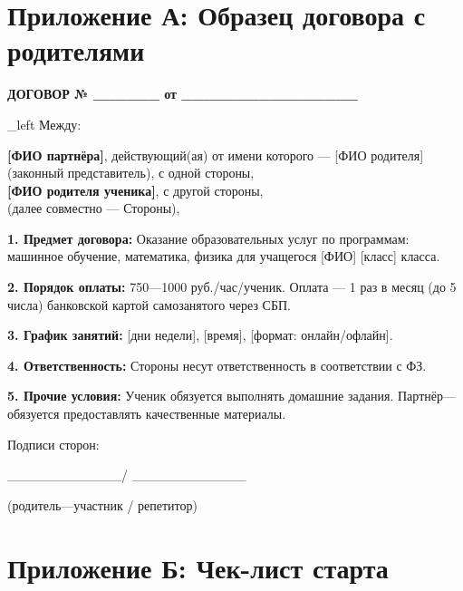 \documentclass[12pt,a4paper]{article}
\begin{document}

\newpage
\section*{Приложение А: Образец договора с родителями}

\textbf{ДОГОВОР № \_\_\_\_\_\_ от \_\_\_\_\_\_\_\_\_\_\_\_\_\_\_\_}

{\ragged_left Между: \par}
{\raggedright
\textbf{[ФИО партнёра]}, действующий(ая) от имени которого --- [ФИО родителя] (законный представитель), с одной стороны, \\
\textbf{[ФИО родителя ученика]}, с другой стороны, \\
(далее совместно --- Стороны), \\
}

\textbf{1. Предмет договора:} Оказание образовательных услуг по программам: машинное обучение, математика, физика для учащегося [ФИО] [класс] класса.

\textbf{2. Порядок оплаты:} 750---1000 руб./час/ученик. Оплата --- 1 раз в месяц (до 5 числа) банковской картой самозанятого через СБП.

\textbf{3. График занятий:} [дни недели], [время], [формат: онлайн/офлайн].

\textbf{4. Ответственность:} Стороны несут ответственность в соответствии с ФЗ.

\textbf{5. Прочие условия:} Ученик обязуется выполнять домашние задания. Партнёр---обязуется предоставлять качественные материалы.

{\raggedleft Подписи сторон: \par}
\_\_\_\_\_\_\_\_\_\_\_\_/ \_\_\_\_\_\_\_\_\_\_\_\_ \hrulefill

(родитель---участник / репетитор)

\newpage
\section*{Приложение Б: Чек-лист старта}
\end{document}
